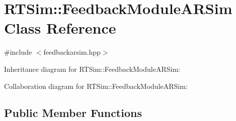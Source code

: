 \hypertarget{classRTSim_1_1FeedbackModuleARSim}{}\section{R\+T\+Sim\+:\+:Feedback\+Module\+A\+R\+Sim Class Reference}
\label{classRTSim_1_1FeedbackModuleARSim}


{\ttfamily \#include $<$feedbackarsim.\+hpp$>$}



Inheritance diagram for R\+T\+Sim\+:\+:Feedback\+Module\+A\+R\+Sim\+:


Collaboration diagram for R\+T\+Sim\+:\+:Feedback\+Module\+A\+R\+Sim\+:
\subsection*{Public Member Functions}

